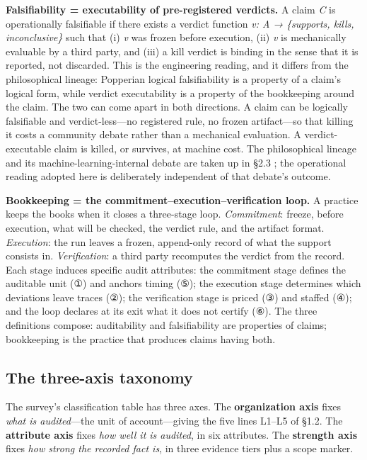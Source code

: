 \documentclass[11pt,a4paper]{article}
\begin{document}
\textbf{Falsifiability = executability of pre-registered verdicts.} A claim \textit{C} is operationally falsifiable if there exists a verdict function \textit{v: A → \{supports, kills, inconclusive\}} such that (i) \textit{v} was frozen before execution, (ii) \textit{v} is mechanically evaluable by a third party, and (iii) a kill verdict is binding in the sense that it is reported, not discarded. This is the engineering reading, and it differs from the philosophical lineage: Popperian logical falsifiability is a property of a claim's logical form, while verdict executability is a property of the bookkeeping around the claim. The two can come apart in both directions. A claim can be logically falsifiable and verdict-less—no registered rule, no frozen artifact—so that killing it costs a community debate rather than a mechanical evaluation. A verdict-executable claim is killed, or survives, at machine cost. The philosophical lineage and its machine-learning-internal debate are taken up in §2.3 \cite{key27,key28}; the operational reading adopted here is deliberately independent of that debate's outcome.

\textbf{Bookkeeping = the commitment–execution–verification loop.} A practice keeps the books when it closes a three-stage loop. \textit{Commitment}: freeze, before execution, what will be checked, the verdict rule, and the artifact format. \textit{Execution}: the run leaves a frozen, append-only record of what the support consists in. \textit{Verification}: a third party recomputes the verdict from the record. Each stage induces specific audit attributes: the commitment stage defines the auditable unit (①) and anchors timing (⑤); the execution stage determines which deviations leave traces (②); the verification stage is priced (③) and staffed (④); and the loop declares at its exit what it does not certify (⑥). The three definitions compose: auditability and falsifiability are properties of claims; bookkeeping is the practice that produces claims having both.

\subsection{The three-axis taxonomy}

The survey's classification table has three axes. The \textbf{organization axis} fixes \textit{what is audited}—the unit of account—giving the five lines L1–L5 of §1.2. The \textbf{attribute axis} fixes \textit{how well it is audited}, in six attributes. The \textbf{strength axis} fixes \textit{how strong the recorded fact is}, in three evidence tiers plus a scope marker.
\end{document}

